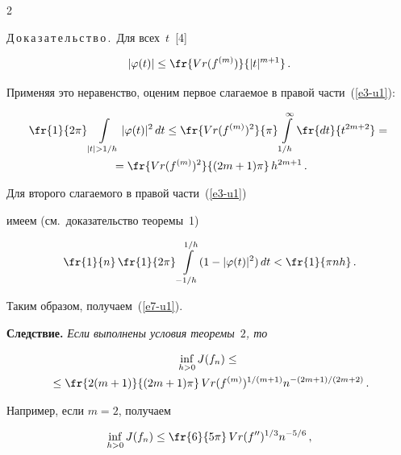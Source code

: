 \begin{multicols}{2}
\noindent

Д\,о\,к\,а\,з\,а\,т\,е\,л\,ь\,с\,т\,в\,о\,.\ Для всех~$t$~[4]

$$

\left\vert\varphi(t)\right\vert\le \fr{Vr(f^{(m)})}{|t|^{m+1}}\,.

$$

Применяя это неравенство, оценим первое слагаемое в правой части~(\ref{e3-u1}):

\begin{multline*}

\fr{1}{2\pi}\int\limits_{|t|>1/h}|\varphi(t)|^2\,dt\le

\fr{Vr(f^{(m)})^2}{\pi}\int\limits_{1/h}^\infty \fr{dt}{t^{2m+2}}

={}\\

{}= \fr{Vr(f^{(m)})^2}{(2m+1)\pi}\,h^{2m+1}\,.

\end{multline*}

Для второго слагаемого в правой части~(\ref{e3-u1})

имеем (см.\ доказательство теоремы~1)

$$

\fr{1}{n}\,\fr{1}{2\pi}\int\limits_{-1/h}^{1/h}(1-|\varphi(t)|^2)\,dt<

\fr{1}{\pi nh}\,.

$$

Таким образом, получаем~(\ref{e7-u1}).



\smallskip



\noindent

\textbf{Следствие.} \textit{Если выполнены условия теоремы~$2$, то}

\begin{multline*}

\inf\limits_{h>0}J(f_n)\le{}\\

{}\le \fr{2(m+1)}{(2m+1)\pi}\,Vr(f^{(m)})^{1/(m+1)}n^{-(2m+1)/(2m+2)}\,.

\end{multline*}



\smallskip

Например, если $m=2$, получаем

$$

\inf\limits_{h>0}J(f_n)\le\fr{6}{5\pi}\,Vr(f'')^{1/3}n^{-5/6}\,,

$$


\end{multicols}
